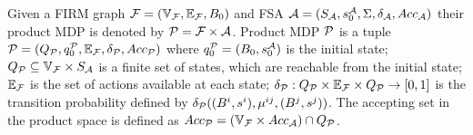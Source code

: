 \documentclass[conference]{IEEEtran}
\begin{document}
\begin{definition}
\label{def:pa}
Given a FIRM graph $\mathcal{F} = (\mathbb{V}_{\mathcal{F}}, \mathbb{E}_{\mathcal{F}}, B_0)$ and FSA $\mathcal{A} = (S_{\mathcal{A}}, s_0^{\mathcal{A}}, \Sigma, \delta_{\mathcal{A}}, Acc_{\mathcal{A}})$ their product MDP is denoted by  $\mathcal{P} = \mathcal{F} \times \mathcal{A}$. Product MDP $\mathcal{P}$
is a tuple $\mathcal{P} = (Q_{\mathcal{P}}, q_0^{\mathcal{P}}, \mathbb{E}_{\mathcal{F}}, \delta_{\mathcal{P}}, Acc_{\mathcal{P}})$ where
$q_0^{\mathcal{P}} = (B_0 , s_0^{\mathcal{A}})$ is the initial state;
$Q_{\mathcal{P}} \subseteq \mathbb{V}_{\mathcal{F}} \times S_{\mathcal{A}} $ is a finite set of states, which are reachable from the initial state; %
$\mathbb{E}_{\mathcal{F}}$ is the set of actions available at each state;
$\delta_{\mathcal{P}} : Q_{\mathcal{P}} \times \mathbb{E}_{\mathcal{F}} \times Q_{\mathcal{P}} \rightarrow [0, 1]$ is the transition probability
defined by $\delta_{\mathcal{P}}((B^i, s^i), \mu^{ij}, (B^j, s^j))$.
The accepting set in the product space is defined as $Acc_{\mathcal{P}} =  (\mathbb{V}_{\mathcal{F}} \times Acc_{\mathcal{A}}) \cap Q_{\mathcal{P}}$.


\end{definition}
\end{document}
